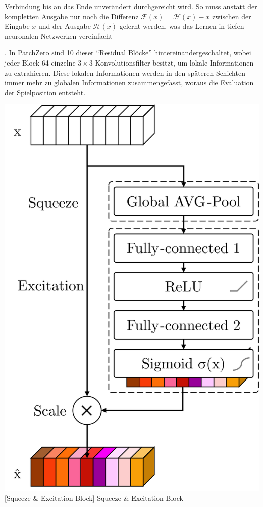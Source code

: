 \begin{minipage}{0.67\textwidth}
    \begin{addmargin}[144.866113pt]{0em}
        Verbindung bis an das Ende unverändert durchgereicht wird. So muss anstatt der kompletten Ausgabe nur noch die Differenz $\mathcal{F}\left(x\right) = \mathcal{H}\left(x\right) - x$ zwischen der Eingabe $x$ und der Ausgabe $\mathcal{H}\left(x\right)$ gelernt werden, was das Lernen in tiefen neuronalen Netzwerken vereinfacht
    \end{addmargin}
    \cite[S. 3]{2015.ResNet}. In PatchZero sind 10 dieser \enquote{Residual Blöcke} hintereinandergeschaltet, wobei jeder Block 64 einzelne $3\times 3$ Konvolutionsfilter besitzt, um lokale Informationen zu extrahieren. Diese lokalen Informationen werden in den späteren Schichten immer mehr zu globalen Informationen zusammengefasst, woraus die Evaluation der Spielposition entsteht.
\end{minipage}
\begin{minipage}{0.33\textwidth}
    \centering
    \captionsetup{type=figure}
    \includegraphics[width=0.95\linewidth]{res/pictures/squeeze-and-excitation-block.pdf}
    [Squeeze \& Excitation Block]{\unskip}\label{fig:squeeze-and-excitation-block}
    Squeeze \& Excitation Block
\end{minipage}

